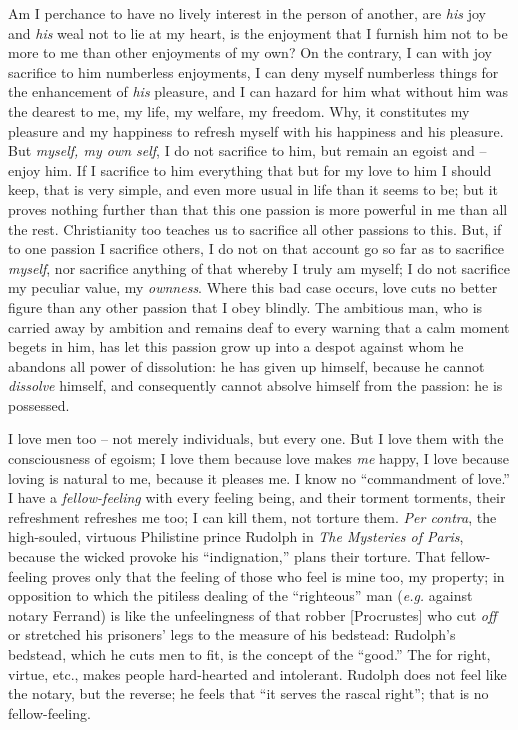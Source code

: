\documentclass[12pt,a4paper]{book}
\begin{document}
Am I perchance to have no lively interest in the person of another, are 
\textit{his} joy and \textit{his} weal not to lie at my heart, is the 
enjoyment that I furnish him not to be more to me than other enjoyments of my 
own? On the contrary, I can with joy sacrifice to him numberless enjoyments, I 
can deny myself numberless things for the enhancement of \textit{his} 
pleasure, and I can hazard for him what without him was the dearest to me, my 
life, my welfare, my freedom. Why, it constitutes my pleasure and my happiness 
to refresh myself with his happiness and his pleasure. But \textit{myself, my 
own self}, I do not sacrifice to him, but remain an egoist and -- enjoy him. 
If I sacrifice to him everything that but for my love to him I should keep, 
that is very simple, and even more usual in life than it seems to be; but it 
proves nothing further than that this one passion is more powerful in me than 
all the rest. Christianity too teaches us to sacrifice all other passions to 
this. But, if to one passion I sacrifice others, I do not on that account go 
so far as to sacrifice \textit{myself}, nor sacrifice anything of that whereby 
I truly am myself; I do not sacrifice my peculiar value, my \textit{ownness}. 
Where this bad case occurs, love cuts no better figure than any other passion 
that I obey blindly. The ambitious man, who is carried away by ambition and 
remains deaf to every warning that a calm moment begets in him, has let this 
passion grow up into a despot against whom he abandons all power of 
dissolution: he has given up himself, because he cannot \textit{dissolve} 
himself, and consequently cannot absolve himself from the passion: he is 
possessed.

I love men too -- not merely individuals, but every one. But I love them with 
the consciousness of egoism; I love them because love makes \textit{me} happy, 
I love because loving is natural to me, because it pleases me. I know no 
``commandment of love.'' I have a \textit{fellow-feeling} with every feeling 
being, and their torment torments, their refreshment refreshes me too; I can 
kill them, not torture them. \textit{Per contra}, the high-souled, virtuous 
Philistine prince Rudolph in \textit{The Mysteries of Paris}, because the 
wicked provoke his ``indignation,'' plans their torture. That fellow-feeling 
proves only that the feeling of those who feel is mine too, my property; in 
opposition to which the pitiless dealing of the ``righteous'' man 
(\textit{e.g.} against notary Ferrand) is like the unfeelingness of that 
robber [Procrustes] who cut \textit{off} or stretched his prisoners' legs to 
the measure of his bedstead: Rudolph's bedstead, which he cuts men to fit, is 
the concept of the ``good.'' The for right, virtue, etc., makes people 
hard-hearted and intolerant. Rudolph does not feel like the notary, but the 
reverse; he feels that ``it serves the rascal right''; that is no 
fellow-feeling.
\end{document}
